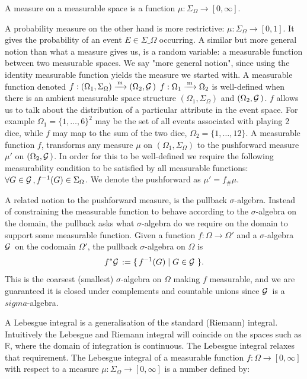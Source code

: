 A measure on a measurable space is a function
 $\mu : \Sigma_\Omega \rightarrow [0, \infty]$. 

A probability measure on the other hand is more restrictive: $\mu : \Sigma_\Omega \rightarrow [0, 1]$.
It gives the probability of an event $E \in \Sigma\_\Omega$ occurring.
A similar but more general notion than what a measure gives us, is a random variable: a measurable
function between two measurable spaces. We say "more general notion", since using the identity measurable function
yields the measure we started with. A measurable function denoted $f : (\Omega_1, \Sigma_\Omega)  \xrightarrow{\,\mathrm{m}\,} (\Omega_2, \mathcal{G}\,)$
$f : \Omega_1  \xrightarrow{\,\mathrm{m}\,} \Omega_2$ is well-defined when there is an ambient measurable space structure $(\Omega_1, \Sigma_\Omega)$
and $(\Omega_2, \mathcal{G}\,)$. $f$ allows us to talk about the distribution of a particular attribute in the event space. For example
$\Omega_1 = \{1,\ldots,6\}^2$ may be the set of all events associated with playing 2 dice, while $f$ may map to the sum of the two dice, $\Omega_2 = \{1,\ldots,12\}$.
A measurable function $f$, transforms any measure $\mu$ on $(\Omega_1, \Sigma_\Omega)$ to the pushforward measure $\mu'$ on $(\Omega_2, \mathcal{G}\,)$.
In order for this to be well-defined we require the following measurability condition to be satisfied by all measurable functions:
$\forall G \in \mathcal{G}\,, f^{-1}(G) \in \Sigma_\Omega$.
We denote the pushforward as $\mu' = f_\#\mu$.

A related notion to the pushforward measure, is the pullback $\sigma$-algebra. Instead of constraining the measurable function to behave according to the $\sigma$-algebra
on the domain, the pullback asks what $\sigma$-algebra do we require on the domain to support some measurable function. Given a function $f : \Omega \rightarrow \Omega'$
and a $\sigma$-algebra $\mathcal{G}\,$ on the codomain $\Omega'$, the pullback $\sigma$-algebra on $\Omega$ is
\[
f^{*}\mathcal{G}\, := \{\, f^{-1}(G) \mid G \in \mathcal{G}\, \,\}.
\]
This is the coarsest (smallest) $\sigma$-algebra on $\Omega$ making $f$ measurable, and we are guaranteed it is closed under complements and
countable unions since $\mathcal{G}\,$ is a $sigma$-algebra. 

A Lebesgue integral is a generalisation of the standard (Riemann) integral. Intuitively the Lebesgue and Riemann integral will coincide on the spaces such as $\mathbb{R}$,
where the domain of integration is continuous. The Lebesgue integral relaxes that requirement. The Lebesgue integral of a measurable function $f : \Omega \rightarrow [0, \infty]$
with respect to a measure $\mu : \Sigma_\Omega \rightarrow [0, \infty] $ is a number defined by:

